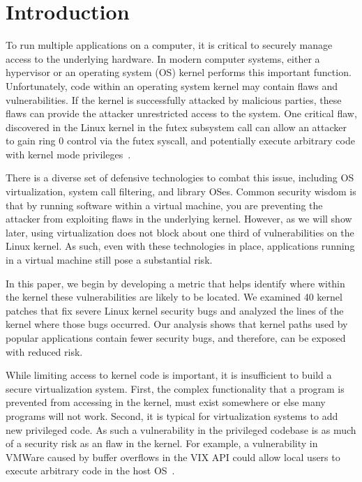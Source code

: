\section{Introduction}
\label{sec.introduction}

To run multiple applications on a computer, it is critical to securely
manage access to the underlying hardware. In modern computer systems,
either a hypervisor or an operating system (OS) kernel performs this
important function. Unfortunately, code within an operating system kernel
may contain flaws and vulnerabilities. If the kernel is successfully
attacked by malicious parties, these flaws can provide the attacker
unrestricted access to the system. One critical flaw, discovered in the
Linux kernel in the futex subsystem call can allow an attacker to gain ring
0 control via the futex syscall, and potentially execute arbitrary code
with kernel mode privileges~\cite{CVE-2014-3153}. 

There is a diverse set of defensive technologies to combat this issue,
including OS virtualization, system call filtering, and library OSes.
Common security wisdom is that by running software within a virtual
machine, you are preventing the attacker from exploiting flaws in the
underlying kernel.  However, as we will show later, using virtualization
does not block about one third of vulnerabilities on the Linux kernel.  As
such, even with these technologies in place, applications running in a
virtual machine still pose a substantial risk.

In this paper, we begin by developing a metric that helps identify where
within the kernel these vulnerabilities are likely to be located. We
examined 40 kernel patches that fix severe Linux kernel security bugs
and analyzed the lines of the kernel where those bugs occurred.  Our
analysis shows that kernel paths used by popular applications contain fewer
security bugs, and therefore, can be exposed with reduced risk. 

While limiting access to kernel code is important, it is
insufficient to build a secure virtualization system.  First, the complex
functionality that a program is prevented from accessing in the kernel, 
must exist somewhere or else many programs will not work.  Second, it is 
typical for virtualization systems to add new privileged code.
As such a vulnerability in the privileged codebase is as much of a security 
risk as an flaw in the kernel.  %
For
example, a vulnerability in VMWare caused by buffer overflows in the VIX
API could allow local users to execute arbitrary code in the host
OS~\cite{CVE-2008-2100}.  

